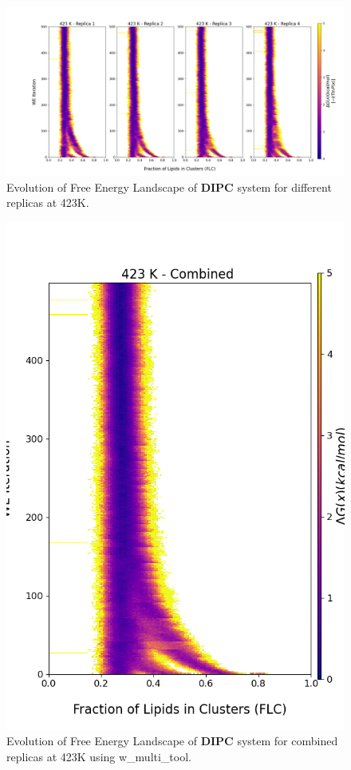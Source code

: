 \documentclass{biophys-new}
\begin{document}
\begin{figure}[hbt!]
\centering
\includegraphics[width=1.1\linewidth]{all_plots/ClusterLipids2Total/DPPC_DIPC_CHOL/423K/Evolution_DIPC_423_ClusterLipids2Total.png}
\caption{Evolution of Free Energy Landscape of \textbf{DIPC} system for different replicas at 423K.}
\label{fig:view}

\end{figure}

\begin{figure}[hbt!]
\centering
\includegraphics[width=0.8\linewidth]{all_plots/ClusterLipids2Total/DPPC_DIPC_CHOL/423K/Evolution_DIPC_MULTI__423_ClusterLipids2Total.png}
\caption{Evolution of Free Energy Landscape of \textbf{DIPC} system for combined replicas at 423K using w\_multi\_tool.}
\label{fig:view}

\end{figure}
\end{document}
